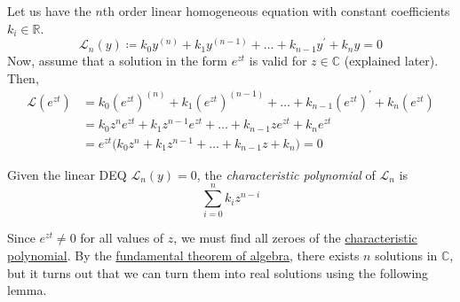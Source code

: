 \documentclass{article}
\newcounter{theorem}[section]
\newcounter{definition}[section]
\begin{document}
      Let us have the $n$th order linear homogeneous equation with constant coefficients $k_i \in \mathbb{R}$. 
      \begin{equation}
        \mathcal{L}_n (y) \coloneqq k_0 y^{(n)} + k_1 y^{(n-1)} + \ldots + k_{n-1} y^\prime + k_n y = 0
      \end{equation}
      Now, assume that a solution in the form $e^{zt}$ is valid for $z \in \mathbb{C}$ (explained later). Then, 
      \begin{align*}
          \mathcal{L}(e^{zt}) & = k_0 (e^{zt})^{(n)} + k_1 (e^{zt})^{(n-1)} + \ldots + k_{n-1} (e^{zt})^\prime + k_n (e^{zt}) \\
          & = k_0 z^n e^{zt} + k_1 z^{n-1} e^{zt} + \ldots + k_{n-1} z e^{zt} + k_n e^{zt} \\
          & = e^{zt} \big( k_0 z^n + k_1 z^{n-1} + \ldots + k_{n-1} z + k_n \big) = 0
      \end{align*}

      \begin{definition}
        \label{def:characteristic-polynomial}
      Given the linear DEQ $\mathcal{L}_n (y) = 0$, the \textit{characteristic polynomial} of $\mathcal{L}_n$ is 
      \begin{equation}
        \sum_{i=0}^n k_i z^{n-i}
      \end{equation}
      \end{definition}

      Since $e^{zt} \neq 0$ for all values of $z$, we must find all zeroes of the \hyperref[def:characteristic-polynomial]{characteristic polynomial}. By the \hyperref[cx-thm:fundamental-theorem-of-algebra]{fundamental theorem of algebra}, there exists $n$ solutions in $\mathbb{C}$, but it turns out that we can turn them into real solutions using the following lemma. 
\end{document}
